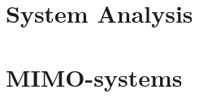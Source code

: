 \documentclass{scrreprt}
\subtitle{Coursework}
\begin{document}
\maketitle

\tableofcontents 

\cleardoublepage

\pagestyle{plain}


\chapter{System Analysis}






\chapter{MIMO-systems}
\end{document}
